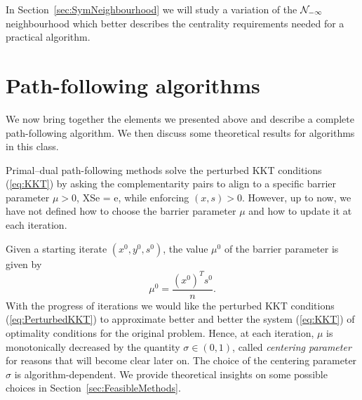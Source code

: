 In Section~\ref{sec:SymNeighbourhood} we will study a variation
of the $\mathcal{N}_{-\infty}$ neighbourhood which better describes
the centrality requirements needed for a practical algorithm.



%
%
\section{Path-following algorithms}
\label{sec:PathFollowingAlgorithms}

We now bring together the elements we presented above and describe
a complete path-following algorithm. We then discuss some
theoretical results for algorithms in this class.

Primal--dual path-following methods solve the perturbed KKT
conditions (\ref{eq:KKT}) by asking the complementarity pairs to align 
to a specific barrier parameter $\mu > 0$,
\be  \label{eq:PerturbedComplementarity}
XSe = \mu e,
\ee
while enforcing $(x,s)>0$.
However, up to now, we have not defined how to choose the
barrier parameter $\mu$ and how to update it at each iteration.

Given a starting iterate $(x^0,y^0,s^0)$, the value $\mu^0$ 
of the barrier parameter is given by
\[
   \mu^0 = \frac{(x^0)^T s^0}{n}.
\]
With the progress of iterations 
we would like the perturbed KKT conditions (\ref{eq:PerturbedKKT}) 
to approximate better and better
the system (\ref{eq:KKT}) of optimality conditions for the original
problem.
Hence, at each iteration, $\mu$ is monotonically decreased by the quantity
$\sigma \in (0,1)$, called {\em centering parameter} for reasons that
will become clear later on.
The choice of the centering parameter $\sigma$ 
is algorithm-dependent. We provide theoretical insights on some
possible choices in Section~\ref{sec:FeasibleMethods}.


